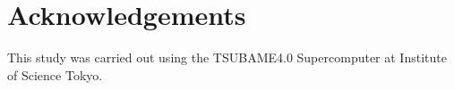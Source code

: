 \documentclass[twoside,twocolumn,9pt]{article}
\renewcommand{\refname}{Notes and references}
\begin{document}
\section*{Acknowledgements}

This study was carried out using the TSUBAME4.0 Supercomputer at Institute of Science Tokyo.



\balance


\end{document}
